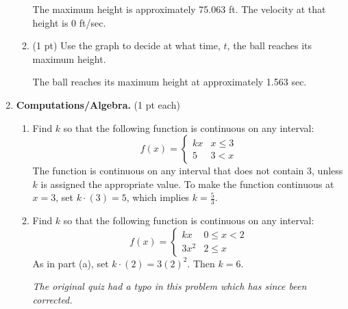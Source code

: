 \documentclass[11pt,letterpaper]{article}
\begin{document}
\begin{enumerate}
\begin{enumerate}
The maximum height is approximately 75.063 ft.  The velocity at that height is 0 ft/sec.

\vspace{.5pc}
\item (1 pt) Use the graph to decide at what time, $t$, the ball reaches its maximum height.

\vspace{.5pc}
The ball reaches its maximum height at approximately 1.563 sec.

\vspace{.5pc}
\end{enumerate}

\item \textbf{Computations/Algebra.} (1 pt each) 
\begin{enumerate} 
\item Find $k$ so that the following function is continuous on any interval:
\[f(x)=\left\{\begin{array}{ll}
               kx & x\leq 3 \\
               5 & 3<x 
              \end{array}\right.\]
The function is continuous on any interval that does not contain 3, unless $k$ is assigned the appropriate value.  To make the function continuous at $x=3$, set $k\cdot (3)=5$, which implies $k=\frac{5}{3}$.

\vspace{.5pc}
\item Find $k$ so that the following function is continuous on any interval:
\[f(x)=\left\{\begin{array}{ll}
               kx & 0\leq x<2 \\
               3x^2 & 2\leq x 
              \end{array}\right.\]
As in part (a), set $k\cdot (2)=3(2)^2$.  Then $k=6$.

\vspace{.5pc}
\textit{The original quiz had a typo in this problem which has since been corrected.}
\end{enumerate}

\end{enumerate}
\end{document}
